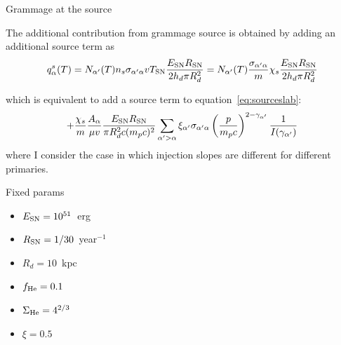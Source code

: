 \documentclass[9pt]{beamer}
\begin{document}
\begin{frame}{Grammage at the source}

The additional contribution from grammage source is obtained by adding an additional source term as
%
\begin{equation}
q^s_\alpha(T) = N_{\alpha'}(T) n_s \sigma_{\alpha'\alpha} v T_{\rm SN} \frac{E_{\rm SN}R_{\rm SN}}{2h_d \pi R_d^2} 
= N_{\alpha'}(T) \frac{\sigma_{\alpha'\alpha}}{m} \chi_s \frac{E_{\rm SN}R_{\rm SN}}{2h_d \pi R_d^2} 
\end{equation}

which is equivalent to add a source term to equation~\ref{eq:sourceslab}:
%
\begin{equation}
+ \frac{\chi_s}{m} \frac{A_\alpha}{\mu v}  \frac{ E_{\rm SN} R_{\rm SN}}{\pi R_d^2 c(m_p c)^2}  \sum_{\alpha'>\alpha} \xi_{\alpha'} \sigma_{\alpha'\alpha} \left(\frac{p}{m_p c}\right)^{2-\gamma_{\alpha'}} \frac{1}{I(\gamma_{\alpha'})}
\end{equation}
%
where I consider the case in which injection slopes are different for different primaries.

\end{frame}

\begin{frame}{Fixed params}

\begin{itemize}
\item $E_{\rm SN} = 10^{51}$~erg
\item $R_{\rm SN} = 1 / 30$~year$^{-1}$
\item $R_d = 10$~kpc
\item $f_{\rm He} = 0.1$
\item $\Sigma_{\rm He} = 4^{2/3}$
\item $\xi = 0.5$
\end{itemize}


\end{frame}
\end{document}
